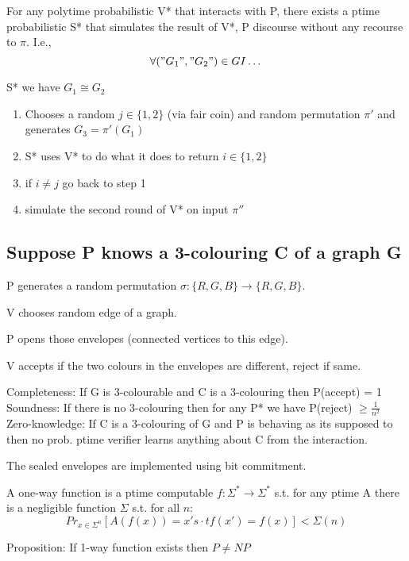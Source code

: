 \documentclass[a4paper,12pt]{article}
\theoremstyle{definition}
\theoremstyle{remark}
\begin{document}
For any polytime probabilistic V* that interacts with P, there exists a ptime probabilistic S* that simulates the result
of V*, P discourse without any recourse to $\pi$. I.e.,
\begin{equation*}
    \forall ("G_1", "G_2") \in GI \dots
\end{equation*}

S* we have $G_1 \cong G_2$
\begin{enumerate}
    \item Chooses a random $j \in \{1, 2\}$ (via fair coin) and random permutation $\pi'$ and generates $G_3 = \pi'(G_1)$
    \item S* uses V* to do what it does to return $i \in \{1, 2\}$
    \item if $i \neq j$ go back to step 1
    \item simulate the second round of V* on input $\pi''$
\end{enumerate}

\subsection*{Suppose P knows a 3-colouring C of a graph G}

P generates a random permutation $\sigma: \{R, G, B\} \to \{R, G, B\}$.

V chooses random edge of a graph.

P opens those envelopes (connected vertices to this edge).

V accepts if the two colours in the envelopes are different, reject if same.

Completeness: If G is 3-colourable and C is a 3-colouring then P(accept) = 1
Soundness: If there is no 3-colouring then for any P* we have P(reject) $\geq \frac{1}{n^2}$
Zero-knowledge: If C is a 3-colouring of G and P is behaving as its supposed to then no prob. ptime verifier 
learns anything about C from the interaction.

The sealed envelopes are implemented using bit commitment.

A one-way function is a ptime computable $f: \Sigma^* \to \Sigma^*$ s.t. for any ptime A there is a negligible function
$\Sigma$ s.t. for all $n$:
\begin{equation*}
    Pr_{x \in \Sigma^n} [A(f(x)) = x' s \cdot t f(x') = f(x)] < \Sigma(n)
\end{equation*}

Proposition: If 1-way function exists then $P \neq NP$
\end{document}
